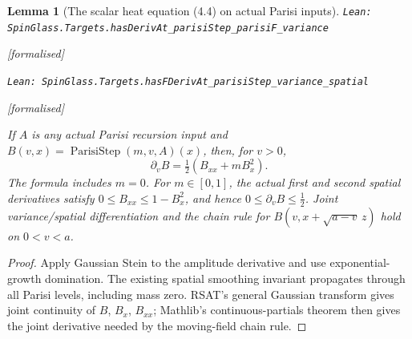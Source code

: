 \documentclass[11pt]{article}
\providecommand{\lean}[1]{\leavevmode\par\nopagebreak
  {\noindent\normalfont\footnotesize\raggedright\texttt{Lean: #1}\par}\nopagebreak}
\providecommand{\leanok}{\par\nopagebreak
  {\noindent\normalfont\footnotesize\textcolor{green!50!black}{[formalised]}\par}\nopagebreak}
\newtheorem{lemma}[theorem]{Lemma}
\begin{document}
\begin{lemma}[The scalar heat equation (4.4) on actual Parisi inputs]
\lean{SpinGlass.Targets.hasDerivAt\_parisiStep\_parisiF\_variance}\leanok
\lean{SpinGlass.Targets.hasFDerivAt\_parisiStep\_variance\_spatial}\leanok
If $A$ is any actual Parisi recursion input and
$B(v,x)=\operatorname{ParisiStep}(m,v,A)(x)$, then, for $v>0$,
\[
 \partial_v B=\tfrac12(B_{xx}+mB_x^2).
\]
The formula includes $m=0$. For $m\in[0,1]$, the actual first and second
spatial derivatives satisfy $0\le B_{xx}\le1-B_x^2$, and hence
$0\le\partial_v B\le\tfrac12$. Joint variance/spatial differentiation and
the chain rule for $B(v,x+\sqrt{a-v}\,z)$ hold on $0<v<a$.
\end{lemma}
\begin{proof}
Apply Gaussian Stein to the amplitude derivative and use exponential-growth
domination. The existing spatial smoothing invariant propagates through all
Parisi levels, including mass zero. RSAT's general Gaussian transform gives
joint continuity of $B$, $B_x$, $B_{xx}$; Mathlib's continuous-partials theorem
then gives the joint derivative needed by the moving-field chain rule.
\end{proof}
\end{document}
